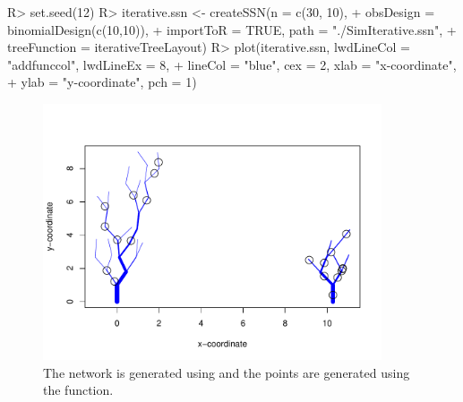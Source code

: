 \documentclass[nojss]{jss}
\renewenvironment{Schunk}{\vspace{\topsep}}{\vspace{\topsep}}
\begin{document}
\begin{Schunk}
\begin{Sinput}
R> set.seed(12)
R> iterative.ssn <- createSSN(n = c(30, 10),
+     obsDesign = binomialDesign(c(10,10)),
+     importToR = TRUE, path = "./SimIterative.ssn",
+     treeFunction = iterativeTreeLayout)
R> plot(iterative.ssn, lwdLineCol = "addfunccol", lwdLineEx = 8,
+     lineCol = "blue", cex = 2, xlab = "x-coordinate",
+     ylab = "y-coordinate", pch = 1)
\end{Sinput}
\end{Schunk}

\begin{figure}[htbp]
  \begin{center}
    \includegraphics[keepaspectratio=true, width = 100mm]{Figures/jss984Fig-SimIterative}
    \caption{The network is generated using 
      and the points are generated using the 
      function. \label{SimIterative}}
  \end{center}
\end{figure}
\end{document}
